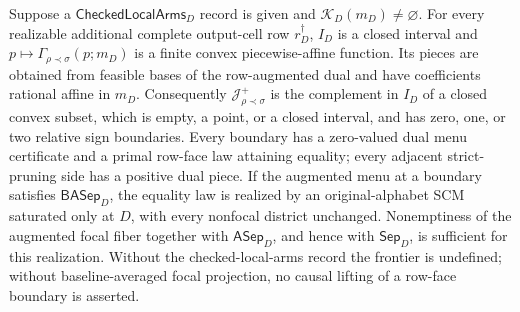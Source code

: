 Suppose a \(\mathsf{CheckedLocalArms}_D\) record is given and \(\mathcal K_D(m_D)\ne\varnothing\).  For every realizable additional complete output-cell row \(r_D^\dagger\), \(I_D\) is a closed interval and \(p\mapsto\Gamma_{\rho\prec\sigma}(p;m_D)\) is a finite convex piecewise-affine function.  Its pieces are obtained from feasible bases of the row-augmented dual and have coefficients rational affine in \(m_D\).  Consequently \(\mathcal J_{\rho\prec\sigma}^+\) is the complement in \(I_D\) of a closed convex subset, which is empty, a point, or a closed interval, and has zero, one, or two relative sign boundaries.  Every boundary has a zero-valued dual menu certificate and a primal row-face law attaining equality; every adjacent strict-pruning side has a positive dual piece.  If the augmented menu at a boundary satisfies \(\mathsf{BASep}_D\), the equality law is realized by an original-alphabet SCM saturated only at \(D\), with every nonfocal district unchanged.  Nonemptiness of the augmented focal fiber together with \(\mathsf{ASep}_D\), and hence with \(\mathsf{Sep}_D\), is sufficient for this realization.  Without the checked-local-arms record the frontier is undefined; without baseline-averaged focal projection, no causal lifting of a row-face boundary is asserted.